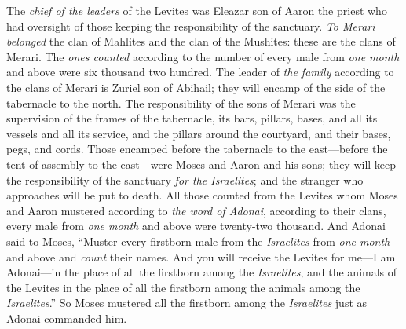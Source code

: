 \begin{biblechapter}
\verse The \textit{chief of the leaders} of the Levites was Eleazar son of Aaron the priest who had oversight of those keeping the responsibility of the sanctuary.
\verse \textit{To Merari belonged} the clan of Mahlites and the clan of the Mushites: these are the clans of Merari.
\verse The \textit{ones counted} according to the number of every male from \textit{one month} and above were six thousand two hundred.
\verse The leader of \textit{the family} according to the clans of Merari is Zuriel son of Abihail; they will encamp of the side of the tabernacle to the north.
\verse The responsibility of the sons of Merari was the supervision of the frames of the tabernacle, its bars, pillars, bases, and all its vessels and all its service,
\verse and the pillars around the courtyard, and their bases, pegs, and cords.
\verse Those encamped before the tabernacle to the east—before the tent of assembly to the east—were Moses and Aaron and his sons; they will keep the responsibility of the sanctuary \textit{for the Israelites}; and the stranger who approaches will be put to death.
\verse All those counted from the Levites whom Moses and Aaron mustered according to \textit{the word of Adonai}, according to their clans, every male from \textit{one month} and above were twenty-two thousand.
\verse And Adonai said to Moses, “Muster every firstborn male from the \textit{Israelites} from \textit{one month} and above and \textit{count} their names.
\verse And you will receive the Levites for me—I am Adonai—in the place of all the firstborn among the \textit{Israelites}, and the animals of the Levites in the place of all the firstborn among the animals among the \textit{Israelites}.”
\verse So Moses mustered all the firstborn among the \textit{Israelites} just as Adonai commanded him.

\end{biblechapter}
